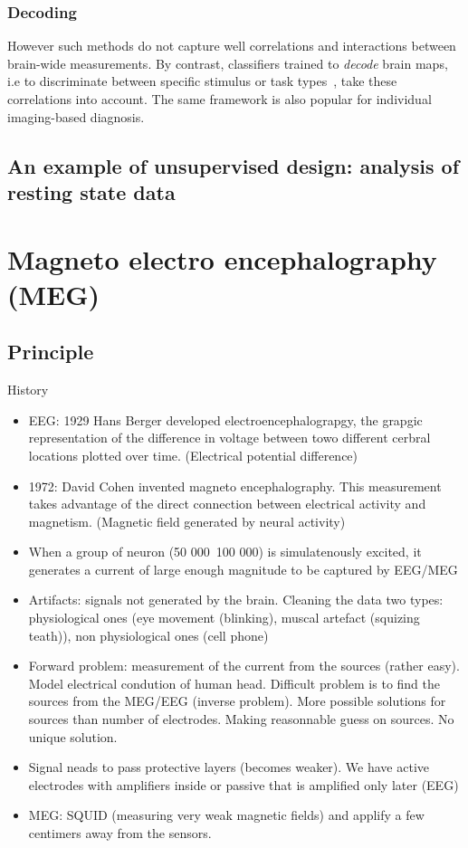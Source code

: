 \subsubsection{Decoding}
However such methods do not capture well correlations and interactions between brain-wide measurements.
By contrast, classifiers trained 
to \emph{decode} brain maps, i.e to discriminate between specific stimulus or task types~\cite{shirer_decoding_2012,varoquaux_how_2014,loula_decoding_2018}, take these correlations into account. 
% 
The same framework is also popular for individual imaging-based diagnosis.

% 
\subsection{An example of unsupervised design: analysis of resting state data}

\section{Magneto electro encephalography (MEG)}
\subsection{Principle}
History
\begin{itemize}
  \item EEG: 1929 Hans Berger developed electroencephalograpgy, the grapgic
    representation of the difference in voltage between towo different cerbral
    locations plotted over time. (Electrical potential difference)
    \item 1972: David Cohen invented magneto encephalography. This measurement
      takes advantage of the direct connection between electrical activity and
      magnetism. (Magnetic field generated by neural activity)

      \item When a group of neuron (50 000~100 000) is simulatenously excited, it generates a current
      of large enough magnitude to be captured by EEG/MEG
    \item Artifacts: signals not generated by the brain. Cleaning the data two types: physiological ones (eye movement (blinking), muscal artefact
      (squizing teath)), non physiological ones (cell phone) 
     \item Forward problem: measurement of the current from the sources (rather
       easy). Model electrical condution of human head.  Difficult problem is to
       find the sources from the MEG/EEG (inverse problem). More possible
       solutions for sources than number of electrodes.
       Making reasonnable guess on sources. No unique solution.

     \item Signal neads to pass protective layers (becomes weaker). We have
       active electrodes with amplifiers inside or passive that is amplified
       only later (EEG)
     \item MEG: SQUID (measuring very weak magnetic fields) and applify a few centimers away from the sensors.
      
\end{itemize}
